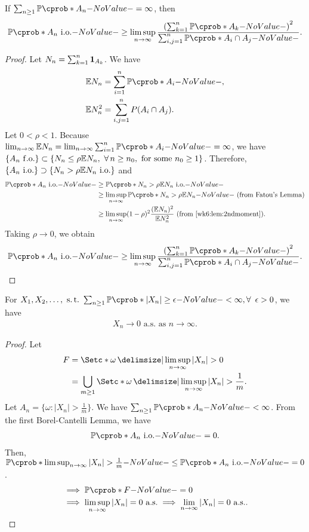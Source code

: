 \documentclass[12pt]{article}
\begin{document}
\begin{Lemma}
If $\sum_{n \geq 1} \P(A_n) = \infty$, then
\begin{align*}
\P(A_n \io) \geq \limsup_{n \to \infty} \frac{\left(\sum_{k=1}^n\P(A_k)\right)^2}{\sum_{i, j=1}^n \P(A_i \cap A_j)}.
\end{align*}
\end{Lemma}
%
\begin{proof}
Let $N_n = \sum_{k=1}^{n} {\bf 1}_{A_k}$. We have
\begin{align*}
\E N_n 
&= \sum_{i=1}^n \P(A_i), \\
\E N_n^2 
&= \sum_{i,j=1}^n P(A_i \cap A_j).
\end{align*}
Let $0 < \rho < 1$. Because $\lim_{n \to \infty} \E N_n = \lim_{n \to \infty} \sum_{i=1}^n \P(A_i) = \infty$, we have $\{A_n \fo\} \subset \{N_n \leq \rho\E N_n,\ \forall n\geq n_0,\ \text{for some } n_0\geq 1\}$. Therefore, $\{A_n \io\} \supset \{N_n > \rho\E N_n \io\}$ and 
\begin{align*}
\P(A_n \io)
&\geq \P(N_n > \rho \E N_n \io) \\
&\geq \limsup_{n \to \infty}  \P(N_n > \rho \E N_n) \ \text{(from Fatou's Lemma)} \\
&\geq \limsup_{n \to \infty} (1-\rho)^2 \frac{(\E N_n)^2}{\E N_n^2} \ \text{(from \cref{wk6:lem:2ndmoment})}.
\end{align*}
Taking $\rho \to 0$, we obtain
\begin{align*}
\P(A_n \io) \geq \limsup_{n \to \infty} \frac{\left(\sum_{k=1}^n\P(A_k)\right)^2}{\sum_{i, j=1}^n \P(A_i \cap A_j)}.
\end{align*}
\end{proof}
%
\begin{Lemma} \label{wk6:lemma:sum_P_finite_convto_0}
For $X_1, X_2, \ldots,\ \st \sum_{n \geq 1} \P(|X_n| \geq \epsilon) < \infty, \forall\ \epsilon > 0$, we have 
\begin{align*}
X_n \to 0 \text{ a.s. as } n \to \infty.
\end{align*}
%
\begin{proof}
Let
\begin{align*}
F 
&= \set*{\omega\given \limsup_{n \to \infty}|X_n| > 0} \\
&= \bigcup_{m \geq 1} \set*{\omega\given \limsup_{n \to \infty}|X_n| > \frac{1}{m}}.
\end{align*}
Let $A_n = \{\omega: |X_n| > \frac{1}{m}\}$. We have $\sum_{n \geq 1} \P(A_n) < \infty$. From the first Borel-Cantelli Lemma, we have
\begin{align*}
\P(A_n \io) = 0.
\end{align*}
Then, $\P(\limsup_{n \to \infty}|X_n| > \frac{1}{m}) \leq \P(A_n \io) =0$.
\begin{align*}
&\implies \P(F) = 0 \\
&\implies \limsup_{n \to \infty}|X_n| = 0 \ \text{a.s.}
\implies \lim_{n \to \infty}|X_n| = 0 \ \text{a.s.}.
\end{align*}
\end{proof}
\end{Lemma}
\end{document}
